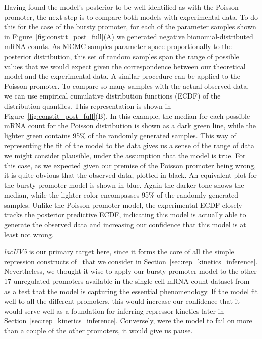 Having found the model's posterior to be well-identified as with the Poisson
promoter, the next step is to compare both models with experimental data. To do
this for the case of the bursty promoter, for each of the parameter samples
shown in Figure~\ref{fig:constit_post_full}(A) we generated negative
bionomial-distributed mRNA counts. As MCMC samples parameter space
proportionally to the posterior distribution, this set of random samples span
the range of possible values that we would expect given the correspondence
between our theoretical model and the experimental data. A similar procedure can
be applied to the Poisson promoter. To compare so many samples with the actual
observed data, we can use empirical cumulative distribution functions (ECDF) of
the distribution quantiles. This representation is shown in
Figure~\ref{fig:constit_post_full}(B). In this example, the median for each
possible mRNA count for the Poisson distribution is shown as a dark green line,
while the lighter green contains 95\% of the randomly generated samples. This
way of representing the fit of the model to the data gives us a sense of the
range of data we might consider plausible, under the assumption that the model
is true. For this case, as we expected given our premise of the Poisson promoter
being wrong, it is quite obvious that the observed data, plotted in black. An 
equivalent plot for the bursty promoter model is shown in blue. Again the darker
tone shows the median, while the lighter color encompasses 95\% of the randomly
generated samples. Unlike the Poisson promoter model, the experimental ECDF
closely tracks the posterior predictive ECDF, indicating this model is actually
able to generate the observed data and increasing our confidence that this model
is at least not wrong.

\textit{lacUV5} is our primary target here, since it forms the core of all the
simple repression constructs of~\cite{Jones2014} that we consider in
Section~\ref{sec:rep_kinetics_inference}. Nevertheless, we thought it wise to
apply our bursty promoter model to the other 17 unregulated promoters available
in the single-cell mRNA count dataset from~\cite{Jones2014} as a test that the
model is capturing the essential phenomenology. If the model fit well to all the
different promoters, this would increase our confidence that it would serve well
as a foundation for inferring repressor kinetics later in
Section~\ref{sec:rep_kinetics_inference}. Conversely, were the model to fail on
more than a couple of the other promoters, it would give us pause.

